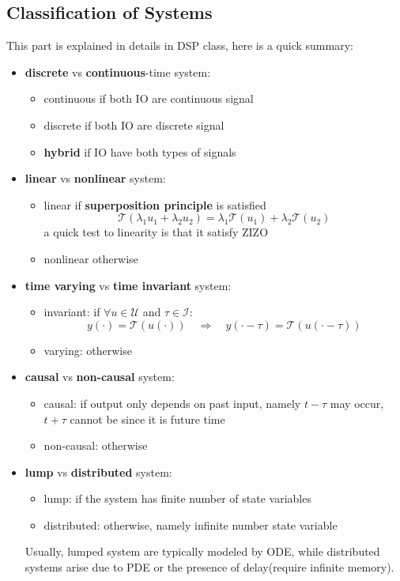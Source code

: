 \documentclass[10pt,a4paper,oneside]{article}
\begin{document}
\subsection{Classification of Systems}
This part is explained in details in DSP class, here is a quick summary:
\begin{itemize}
	\item \textbf{discrete} vs \textbf{continuous}-time system: 
	\begin{itemize}
		\item continuous if both IO are continuous signal
		\item discrete if both IO are discrete signal
		\item \textbf{hybrid} if IO have both types of signals
	\end{itemize}
	\item \textbf{linear} vs \textbf{nonlinear} system: 
	\begin{itemize}
		\item linear if \textbf{superposition principle} is satisfied
		\[
		\mathcal{T}(\lambda_1 u_1 + \lambda_2 u_2) = \lambda_1 \mathcal{T} (u_1) +  \lambda_2 \mathcal{T}(u_2)
		\]
		a quick test to linearity is that it satisfy ZIZO
		\item nonlinear otherwise
	\end{itemize}
	\item \textbf{time varying} vs \textbf{time invariant} system: 
	\begin{itemize}
		\item invariant: if $\forall u \in \mathcal{U}$ and $\tau \in \mathcal{I}$:
		\[
		y(\cdot) = \mathcal{T}(u(\cdot)) \quad \Longrightarrow \quad  y(\cdot - \tau) = \mathcal{T}(u(\cdot - \tau))
		\]
		\item varying: otherwise
	\end{itemize}
	\item \textbf{causal} vs \textbf{non-causal} system: 
	\begin{itemize}
		\item causal: if  output only depends on past input, namely $t-\tau$ may occur, $t+\tau$ cannot be since it is future time
		\item non-causal:  otherwise
	\end{itemize}
	\item \textbf{lump} vs \textbf{distributed} system: 
	\begin{itemize}
		\item lump: if the system has finite number of state variables
		\item distributed: otherwise, namely infinite number state variable
	\end{itemize}
	Usually, lumped system are typically modeled by ODE, while distributed systems arise due to PDE or the presence of delay(require infinite memory).
\end{itemize}
\end{document}

